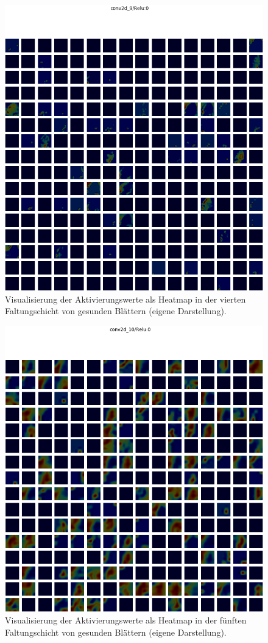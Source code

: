 \begin{figure}[h!]
	\centering
	\includegraphics[width=\textwidth]{visualisierungen/healthy/heatmap_mit/conv2d_9.png}
	\caption{Visualisierung der Aktivierungswerte als Heatmap in der vierten Faltungschicht von gesunden Blättern (eigene Darstellung).}
	\label{}
\end{figure}

\begin{figure}[h!]
	\centering
	\includegraphics[width=\textwidth]{visualisierungen/healthy/heatmap_mit/conv2d_10.png}
	\caption{Visualisierung der Aktivierungswerte als Heatmap in der fünften Faltungschicht von gesunden Blättern (eigene Darstellung).}
	\label{conv2d_10_heat}
\end{figure}
